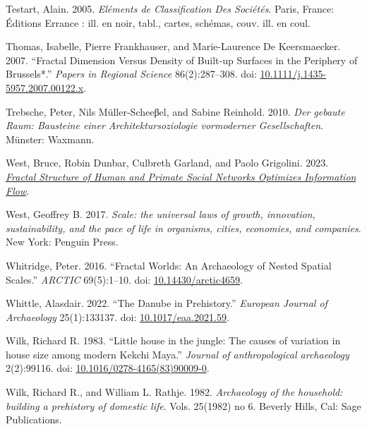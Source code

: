 \documentclass[
  12pt,
]{book}
\newlength{\cslhangindent}
\newlength{\cslentryspacingunit} %
\newenvironment{CSLReferences}[2] %
 {%
  \setlength{\parindent}{0pt}
  \ifodd #1
  \let\oldpar\par
  \def\par{\hangindent=\cslhangindent\oldpar}
  \fi
  \setlength{\parskip}{#2\cslentryspacingunit}
 }%
 {}
\begin{document}
\begin{CSLReferences}{1}{0}
\leavevmode{}%
Testart, Alain. 2005. \emph{Eléments de Classification Des Sociétés}. Paris, France: Éditions Errance : ill. en noir, tabl., cartes, schémas, couv. ill. en coul.

\leavevmode{}%
Thomas, Isabelle, Pierre Frankhauser, and Marie-Laurence De Keersmaecker. 2007. {``Fractal Dimension Versus Density of Built-up Surfaces in the Periphery of Brussels*.''} \emph{Papers in Regional Science} 86(2):287--308. doi: \href{https://doi.org/10.1111/j.1435-5957.2007.00122.x}{10.1111/j.1435-5957.2007.00122.x}.

\leavevmode{}%
Trebsche, Peter, Nils Müller-Scheeβel, and Sabine Reinhold. 2010. \emph{Der gebaute Raum: Bausteine einer Architektursoziologie vormoderner Gesellschaften}. Münster: Waxmann.

\leavevmode{}%
West, Bruce, Robin Dunbar, Culbreth Garland, and Paolo Grigolini. 2023. \emph{\href{https://doi.org/10.1101/2023.02.23.529431}{Fractal Structure of Human and Primate Social Networks Optimizes Information Flow}}.

\leavevmode{}%
West, Geoffrey B. 2017. \emph{Scale: the universal laws of growth, innovation, sustainability, and the pace of life in organisms, cities, economies, and companies}. New York: Penguin Press.

\leavevmode{}%
Whitridge, Peter. 2016. {``Fractal Worlds: An Archaeology of Nested Spatial Scales.''} \emph{ARCTIC} 69(5):1--10. doi: \href{https://doi.org/10.14430/arctic4659}{10.14430/arctic4659}.

\leavevmode{}%
Whittle, Alasdair. 2022. {``The Danube in Prehistory.''} \emph{European Journal of Archaeology} 25(1):133137. doi: \href{https://doi.org/10.1017/eaa.2021.59}{10.1017/eaa.2021.59}.

\leavevmode{}%
Wilk, Richard R. 1983. {``Little house in the jungle: The causes of variation in house size among modern Kekchi Maya.''} \emph{Journal of anthropological archaeology} 2(2):99116. doi: \href{https://doi.org/10.1016/0278-4165(83)90009-0}{10.1016/0278-4165(83)90009-0}.

\leavevmode{}%
Wilk, Richard R., and William L. Rathje. 1982. \emph{Archaeology of the household: building a prehistory of domestic life}. Vols. 25(1982) no 6. Beverly Hills, Cal: Sage Publications.


\end{CSLReferences}
\end{document}
